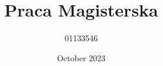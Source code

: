 \documentclass[11pt, twoside]{article}
\title{Praca Magisterska}
\author{01133546}
\date{October 2023}
\begin{document}

\cleardoublepage


\cleardoublepage

\begin{spacing}{1.15}




\cleardoublepage

\tableofcontents
\clearpage

\clearpage


\clearpage


\clearpage


\clearpage


\clearpage


\clearpage


\clearpage


\clearpage


\clearpage


\clearpage

\end{spacing}

\clearpage
\listoffigures

\listoftables
\clearpage
\printbibliography[title=Bibliografia]
\end{document}
